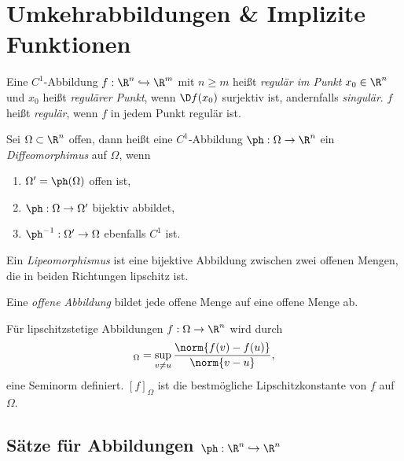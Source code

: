 \section{Umkehrabbildungen \& Implizite Funktionen}

\begin{defn}
Eine $C^1$-Abbildung $f: \R^n\hookrightarrow\R^m$ mit $n\ge m$ heißt
\emph{regulär im Punkt $x_0\in\R^n$} und $x_0$ heißt \emph{regulärer Punkt},
wenn $\D f(x_0)$ surjektiv ist, andernfalls \emph{singulär}. $f$ heißt
\emph{regulär}, wenn $f$ in jedem Punkt regulär ist.
\end{defn}
\begin{defn}
Sei $\Omega \subset \R^n$ offen, dann heißt eine $C^1$-Abbildung $\ph: \Omega\to
\R^n$ ein \emph{Diffeomorphimus} auf $\Omega$, wenn
\begin{enumerate}
  \item $\Omega' = \ph(\Omega)$ offen ist,
  \item $\ph: \Omega\to\Omega'$ bijektiv abbildet,
  \item $\ph^{-1}: \Omega'\to\Omega$ ebenfalls $C^1$ ist.
\end{enumerate}
\end{defn}
\begin{defn}
Ein \emph{Lipeomorphismus} ist eine bijektive Abbildung zwischen zwei offenen
Mengen, die in beiden Richtungen lipschitz ist.
\end{defn}
\begin{defn}
Eine \emph{offene Abbildung} bildet jede offene Menge auf eine offene
Menge ab.
\end{defn}
\begin{defn}
Für lipschitzstetige Abbildungen $f: \Omega\to\R^n$ wird durch
\begin{align*}
[f]_\Omega = \sup\limits_{v\neq u} \frac{\norm{f(v)-f(u)}}{\norm{v-u}},
\end{align*}
eine Seminorm definiert. $[f]_\Omega$ ist die bestmögliche Lipschitzkonstante
von $f$ auf $\Omega$.
\end{defn}

\subsection{Sätze für Abbildungen $\ph: \R^n\hookrightarrow\R^n$}

